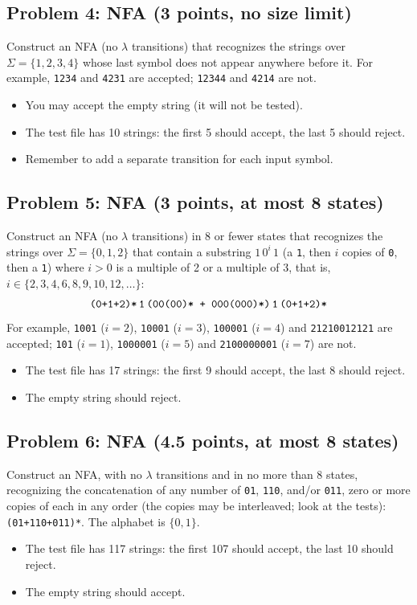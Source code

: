 \documentclass[11pt]{article}
\newcommand{\re}[1]{\texttt{#1}}
\begin{document}
\subsection*{Problem 4: NFA (3 points, no size limit)}
Construct an NFA (no $\lambda$ transitions) that recognizes the strings over $\Sigma=\{1,2,3,4\}$ whose last symbol does
not appear anywhere before it. For example, \texttt{1234} and \texttt{4231} are accepted;
\texttt{12344} and \texttt{4214} are not.
\begin{itemize}
  \item You may accept the empty string (it will not be tested).
  \item The test file has 10 strings: the first 5 should accept, the last 5 should reject.
  \item Remember to add a separate transition for each input symbol.
\end{itemize}

\subsection*{Problem 5: NFA (3 points, at most 8 states)}
Construct an NFA (no $\lambda$ transitions) in 8 or fewer states that recognizes the strings over $\Sigma=\{0,1,2\}$ that
contain a substring $1\,0^i\,1$ (a \texttt{1}, then $i$ copies of \texttt{0}, then a
\texttt{1}) where $i > 0$ is a multiple of 2 or a multiple of 3, that is,
$i \in \{2, 3, 4, 6, 8, 9, 10, 12, \ldots\}$:
\[
  \re{(0+1+2)*\,1\,(00(00)* + 000(000)*)\,1\,(0+1+2)*}
\]
For example, \texttt{1001} ($i=2$), \texttt{10001} ($i=3$), \texttt{100001} ($i=4$) and
\texttt{21210012121} are accepted; \texttt{101} ($i=1$), \texttt{1000001} ($i=5$) and
\texttt{2100000001} ($i=7$) are not.
\begin{itemize}
  \item The test file has 17 strings: the first 9 should accept, the last 8 should reject.
  \item The empty string should reject.
\end{itemize}

\subsection*{Problem 6: NFA (4.5 points, at most 8 states)}
Construct an NFA, with no $\lambda$ transitions and in no more than 8 states, recognizing the
concatenation of any number of \texttt{01}, \texttt{110}, and/or \texttt{011}, zero or more
copies of each in any order (the copies may be interleaved; look at the tests):
\re{(01+110+011)*}. The alphabet is $\{0,1\}$.
\begin{itemize}
  \item The test file has 117 strings: the first 107 should accept, the last 10 should reject.
  \item The empty string should accept.
\end{itemize}
\end{document}
